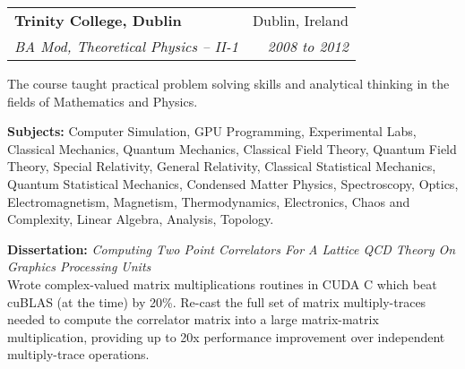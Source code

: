 \documentclass[11pt]{article}
\makeatletter
\newenvironment{resumeSubSectionHeader}{
    \par
    \begin{tabular*}{\textwidth}{l@{\extracolsep{\fill}}r}
    \par
} {
    \end{tabular*}
    \par
}
\newenvironment{resumeSubSectionBody}{
    \par
    \vspace{-0.2\parskip}
    \begin{small}
    \par
} {
    \par
    \end{small}
    \par
}
\newenvironment{resumeDescription}{
    \vspace{-0.5\baselineskip}
    \begin{description}
} {
    \end{description}
}
\makeatother
\begin{document}
%
%
\begin{resumeSubSectionHeader}

    \textbf{Trinity College, Dublin}   & Dublin, Ireland     \\
    \emph{BA Mod, Theoretical Physics -- II-1} & \emph{2008 to 2012}

\end{resumeSubSectionHeader}
\begin{resumeSubSectionBody}

    The course taught practical problem solving skills and analytical thinking
    in the fields of Mathematics and Physics.

    \begin{resumeDescription}
        \item{\bf Subjects:}
            Computer Simulation, GPU Programming,
            Experimental Labs,
            Classical Mechanics, Quantum Mechanics,
            Classical Field Theory, Quantum Field Theory,
            Special Relativity, General Relativity,
            Classical Statistical Mechanics, Quantum Statistical Mechanics,
            Condensed Matter Physics, Spectroscopy,
            Optics, Electromagnetism, Magnetism, Thermodynamics,
            Electronics, Chaos and Complexity,
            Linear Algebra, Analysis,
            Topology.

        \item{
            {\bf Dissertation:}
            \it Computing Two Point Correlators For A Lattice QCD Theory On
            Graphics Processing Units
        } \\
            Wrote complex-valued matrix multiplications routines in CUDA C which
            beat cuBLAS (at the time) by 20\%.
            Re-cast the full set of matrix multiply-traces needed to compute the
            correlator matrix into a large matrix-matrix multiplication,
            providing up to 20x performance improvement over independent
            multiply-trace operations.
    \end{resumeDescription}

\end{resumeSubSectionBody}




\end{document}
